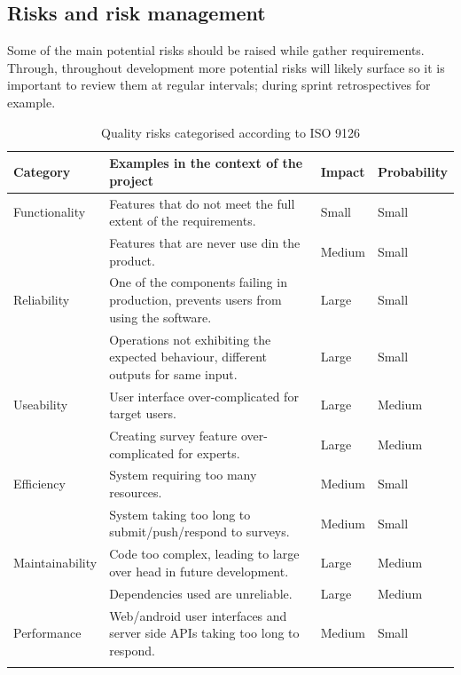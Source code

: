 \subsection{Risks and risk management}
Some of the main potential risks should be raised while gather requirements.
Through, throughout development more potential risks will likely surface so it is important to review them at regular intervals; during
sprint retrospectives for example.

\begin{longtable}{|p{}|p{}|p{}|p{}|}
    \hline
    Category        & Examples in the context of the project                                              & Impact & Probability   \\
    \hline\hline    
    Functionality   & Features that do not meet the full extent of the requirements.                      & Small  & Small         \\
                    & Features that are never use din the product.                                        & Medium & Small         \\
    \hline  
    Reliability     & One of the components failing in production, prevents users from using the software.& Large  & Small         \\
                    & Operations not exhibiting the expected behaviour, different outputs for same input. & Large  & Small         \\ 
    \hline  
    Useability      & User interface over-complicated for target users.                                   & Large  & Medium        \\
                    & Creating survey feature over-complicated for experts.                               & Large  & Medium        \\
    \hline  
    Efficiency      & System requiring too many resources.                                                & Medium & Small         \\
                    & System taking too long to submit/push/respond to surveys.                           & Medium & Small         \\     
    \hline
    Maintainability & Code too complex, leading to large over head in future development.                 & Large  & Medium        \\
                    & Dependencies used are unreliable.                                                   & Large  & Medium        \\
    \hline
    Performance     & Web/android user interfaces and server side APIs  taking too long to respond.       & Medium & Small         \\
    \hline
    
    \caption{Quality risks categorised according to ISO 9126}
\end{longtable}

